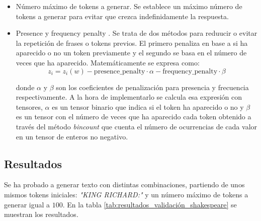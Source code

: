 \documentclass[11pt]{book}
\theoremstyle{plain}
\theoremstyle{definition}
\begin{document}
\begin{itemize}
    \item Número máximo de tokens a generar. Se establece un máximo número de tokens a generar para evitar que crezca indefinidamente la respuesta.
    
    \item Presence y frequency penalty \parencite{vyas2025transformer_decoder_part3}.
Se trata de dos métodos para reduucir o evitar la repetición de frases o tokens previos. El primero penaliza en base a si ha aparecido o no un token previamente y el segundo se basa en el número de veces que ha aparecido. Matemáticamente se expresa como: 
    \[
        z_i = z_i(w) - \text{presence\_penalty} \cdot \alpha - \text{frequency\_penalty} \cdot \beta
    \]

    donde $\alpha$ y $\beta$ son los coeficientes de penalización para presencia y frecuencia respectivamente.
A la hora de implementarlo se calcula esa expresión con tensores, $\alpha$ es un tensor binario que indica si el token ha aparecido o no y $\beta$ es un tensor con el número de veces que ha aparecido cada token obtenido a través del método \textit{bincount} que cuenta el número de ocurrencias de cada valor en un tensor de enteros no negativo.
\end{itemize}
\subsection{Resultados}

Se ha probado a generar texto con distintas combinaciones, partiendo de unos mismos tokens iniciales: \textit{"KING RICHARD:"} y un número máximo de tokens a generar igual a $100$. En la tabla \ref{tab:resultados_validación_shakespeare} se muestran los resultados.
\end{document}
